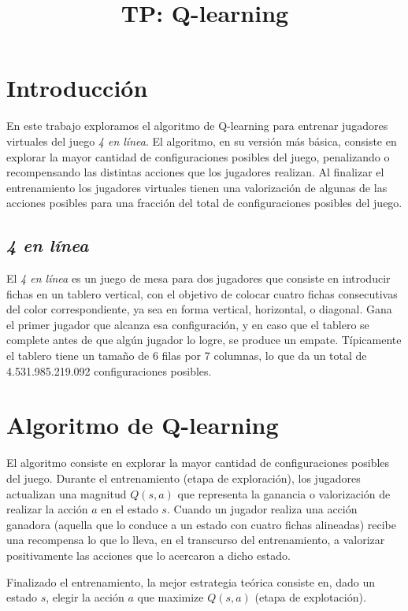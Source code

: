 \documentclass[11pt, spanish]{article}
\title{TP: Q-learning}
\begin{document}
\maketitle

\section{Introducción}
\par En este trabajo exploramos el algoritmo de Q-learning para entrenar 
jugadores virtuales del juego \emph{4 en línea}. El algoritmo, en su versión 
más básica, consiste en explorar la mayor cantidad de configuraciones 
posibles del juego, penalizando o recompensando las distintas acciones 
que los jugadores realizan. Al finalizar el 
entrenamiento los jugadores virtuales tienen una valorización de algunas de las 
acciones posibles para una fracción del total de configuraciones posibles del 
juego. 

\subsection{\emph{4 en línea}}

\par El \emph{4 en línea} es un juego de mesa para dos jugadores que consiste 
en introducir fichas en un tablero vertical, con el objetivo de colocar cuatro 
fichas consecutivas del color correspondiente, ya sea en forma vertical, 
horizontal, o diagonal. Gana el primer jugador que alcanza esa configuración, y 
en caso que el tablero se complete antes de que algún jugador lo logre, se 
produce un empate. 
Típicamente el tablero tiene un tamaño de 6 filas por 7 columnas, lo que da un 
total de 4.531.985.219.092 configuraciones posibles.

\section{Algoritmo de Q-learning}

\par El algoritmo consiste en explorar la mayor cantidad de configuraciones 
posibles del juego. Durante el entrenamiento (etapa de exploración), los 
jugadores actualizan una magnitud $Q(s,a)$ que representa la ganancia o 
valorización de realizar la acción $a$ en el estado $s$. Cuando un jugador 
realiza una acción ganadora (aquella que lo conduce a un estado con cuatro 
fichas alineadas) recibe una recompensa lo que lo lleva, en el 
transcurso del entrenamiento, a valorizar positivamente las 
acciones que lo acercaron a dicho estado. 
\par Finalizado el entrenamiento, la mejor estrategia teórica consiste en, dado 
un estado $s$, elegir la acción $a$ que maximize $Q(s,a)$ (etapa de 
explotación).
\end{document}
